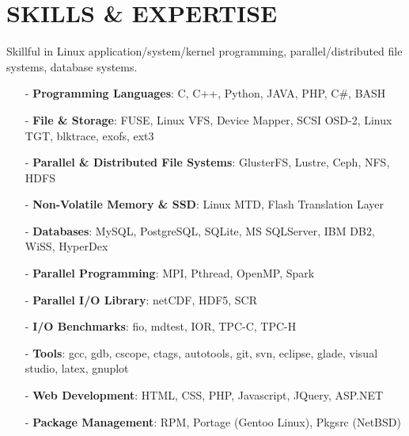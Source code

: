 \section{SKILLS \& EXPERTISE}
Skillful in Linux application/system/kernel programming, parallel/distributed file systems, database systems.
\begin{itemize}[leftmargin=*]
\setlength\itemsep{-0.02in}
\item[-] {\bf Programming Languages}: C, C++, Python, JAVA, PHP, C\#, BASH
\item[-] {\bf File \& Storage}: FUSE, Linux VFS, Device Mapper, SCSI OSD-2, Linux TGT,
              blktrace, exofs, ext3
\item[-] {\bf Parallel \& Distributed File Systems}: GlusterFS, Lustre, Ceph, NFS, HDFS
\item[-] {\bf Non-Volatile Memory \& SSD}: Linux MTD, Flash Translation Layer
\item[-] {\bf Databases}: MySQL, PostgreSQL, SQLite, MS SQLServer, IBM DB2, WiSS, HyperDex
\item[-] {\bf Parallel Programming}: MPI, Pthread, OpenMP, Spark
\item[-] {\bf Parallel I/O Library}: netCDF, HDF5, SCR
\item[-] {\bf I/O Benchmarks}: fio, mdtest, IOR, TPC-C, TPC-H
\item[-] {\bf Tools}: gcc, gdb, cscope, ctags, autotools, git, svn, eclipse, glade, visual studio, latex, gnuplot
\item[-] {\bf Web Development}: HTML, CSS, PHP, Javascript, JQuery, ASP.NET
\item[-] {\bf Package Management}: RPM, Portage (Gentoo Linux), Pkgsrc (NetBSD)
\end{itemize}

